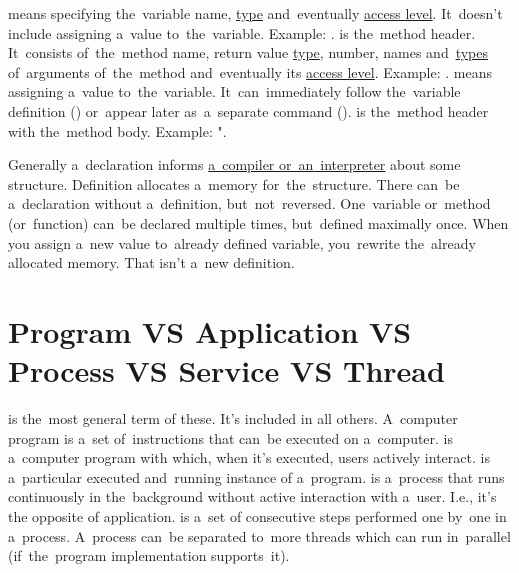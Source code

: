 \label{declarationdefinition}
\begin{itemize}
     means specifying the~variable name, \hyperref[datatypes]{type} and~eventually \hyperref[javaaccessmodifiers]{access level}.
            It~doesn't include assigning a~value to~the~variable.
            Example: .
     is the~method header.
            It~consists of~the~method name, return value \hyperref[datatypes]{type}, number, names and~\hyperref[datatypes]{types} of~arguments of~the~method and~eventually its \hyperref[javaaccessmodifiers]{access level}.
            Example: .
     means assigning a~value to~the~variable.
            It~can~immediately follow the~variable definition () or~appear later as~a~separate command ().
     is the~method header with the~method body.
            Example: ".
\end{itemize}
\newpage

\noindent Generally a~declaration informs \hyperref[compiledinterpretedlanguages]{a~compiler or~an~interpreter} about some structure.
Definition allocates a~memory for~the~structure.
There can~be a~declaration without a~definition, but~not~reversed.
One~variable or~method (or~function) can~be declared multiple times, but~defined maximally once.
When you assign a~new value to~already defined variable, you~rewrite the~already allocated memory.
That isn't a~new definition.

\section*{\fontsize{17}{17} \selectfont Program VS Application VS Process VS Service VS Thread}
\label{applicationprocessprogramservicethread}
\begin{itemize}
     is the~most general term of these.
            It's included in all others.
            A~computer program is a~set of~instructions that can~be executed on a~computer.
     is a~computer program with which, when it's executed, users actively interact.
     is a~particular executed and~running instance of a~program.
     is a~process that runs continuously in the~background without active interaction with a~user.
            I.e., it's the opposite of application.
     is a~set of consecutive steps performed one by~one in a~process.
            A~process can~be separated to~more threads which can run in~parallel (if~the~program implementation supports~it).
\end{itemize}

